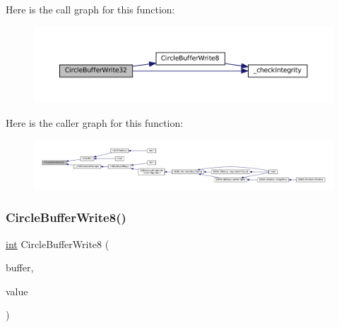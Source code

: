 Here is the call graph for this function\+:
\nopagebreak
\begin{figure}[H]
\begin{center}
\leavevmode
\includegraphics[width=350pt]{circle-buffer_8c_a056daa52414e0ab9796fa8079100bd82_cgraph}
\end{center}
\end{figure}
Here is the caller graph for this function\+:
\nopagebreak
\begin{figure}[H]
\begin{center}
\leavevmode
\includegraphics[width=350pt]{circle-buffer_8c_a056daa52414e0ab9796fa8079100bd82_icgraph}
\end{center}
\end{figure}
\mbox{\label{circle-buffer_8c_aa1562239ba1cf3c0e7d570a184bcbd7b}} 
\subsubsection{\texorpdfstring{Circle\+Buffer\+Write8()}{CircleBufferWrite8()}}
{\footnotesize\ttfamily \mbox{\hyperlink{ioapi_8h_a787fa3cf048117ba7123753c1e74fcd6}{int}} Circle\+Buffer\+Write8 (\begin{DoxyParamCaption}\item[{struct Circle\+Buffer $\ast$}]{buffer,  }\item[{int8\+\_\+t}]{value }\end{DoxyParamCaption})}

